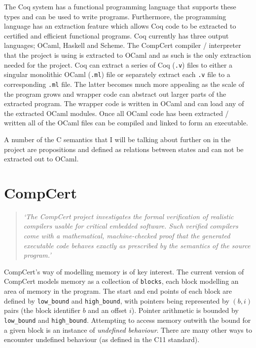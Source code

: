 The Coq system has a functional programming language that supports these types and can be used to write programs. Furthermore, the programming language has an extraction feature\cite{coq-extraction} which allows Coq code to be extracted to certified and efficient functional programs. Coq currently has three output languages; OCaml\cite{leroy2014ocaml}, Haskell\cite{jones2003haskell} and Scheme\cite{dybvig2009scheme}. The CompCert compiler / interpreter that the project is using is extracted to OCaml and as such is the only extraction needed for the project. Coq can extract a series of Coq (\texttt{.v}) files to either a singular monolithic OCaml (\texttt{.ml}) file or separately extract each \texttt{.v} file to a corresponding \texttt{.ml} file\cite{coq_extraction}. The latter becomes much more appealing as the scale of the program grows and wrapper code can abstract out larger parts of the extracted program. The wrapper code is written in OCaml and can load any of the extracted OCaml modules. Once all OCaml code has been extracted / written all of the OCaml files can be compiled and linked to form an executable.

A number of the C semantics that I will be talking about further on in the project are propositions and defined as relations between states and can not be extracted out to OCaml.

\section{CompCert}\label{compcert}

\begin{quotation}
    \textit{
    `The CompCert project investigates the formal verification of realistic compilers usable for critical embedded software. Such verified compilers come with a mathematical, machine-checked proof that the generated executable code behaves exactly as prescribed by the semantics of the source program.'}~\cite{noauthor_compcert_nodate}
\end{quotation}
    CompCert's way of modelling memory is of key interest. The current version of CompCert models memory as a collection of \texttt{blocks}, each block modelling an area of memory in the program. The start and end points of each block are defined by  \texttt{low\_bound} and \texttt{high\_bound}, with pointers being represented by  $(b,i)$ pairs (the block identifier $b$ and an offset $i$). Pointer arithmetic is bounded by \texttt{low\_bound} and \texttt{high\_bound}. Attempting to access memory outwith the bound for a given block is an instance of \textit{undefined behaviour}. There are many other ways to encounter undefined behaviour (as defined in the C11 standard)\cite{iso_standard}.
    
